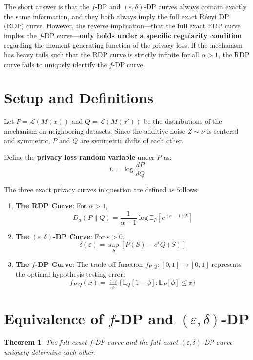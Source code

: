 \documentclass[11pt]{article}
\newtheorem{theorem}{Theorem}
\begin{document}
The short answer is that the $f$-DP and $(\varepsilon,\delta)$-DP curves always contain exactly the same information, and they both always imply the full exact R\'enyi DP (RDP) curve. However, the reverse implication---that the full exact RDP curve implies the $f$-DP curve---\textbf{only holds under a specific regularity condition} regarding the moment generating function of the privacy loss. If the mechanism has heavy tails such that the RDP curve is strictly infinite for all $\alpha > 1$, the RDP curve fails to uniquely identify the $f$-DP curve.

\section{Setup and Definitions}

Let $P = \mathcal{L}(M(x))$ and $Q = \mathcal{L}(M(x'))$ be the distributions of the mechanism on neighboring datasets. Since the additive noise $Z \sim \nu$ is centered and symmetric, $P$ and $Q$ are symmetric shifts of each other. 

Define the \textbf{privacy loss random variable} under $P$ as:
\[ L = \log \frac{dP}{dQ} \]

The three exact privacy curves in question are defined as follows:
\begin{enumerate}
    \item \textbf{The RDP Curve}: For $\alpha > 1$,
    \[ D_\alpha(P\|Q) = \frac{1}{\alpha-1} \log \mathbb{E}_P \left[ e^{(\alpha-1)L} \right] \]
    \item \textbf{The $(\varepsilon, \delta)$-DP Curve}: For $\varepsilon > 0$,
    \[ \delta(\varepsilon) = \sup_{S} [P(S) - e^\varepsilon Q(S)] \]
    \item \textbf{The $f$-DP Curve}: The trade-off function $f_{P,Q}: [0,1] \to [0,1]$ represents the optimal hypothesis testing error:
    \[ f_{P,Q}(x) = \inf_{\phi} \{ \mathbb{E}_Q[1 - \phi] : \mathbb{E}_P[\phi] \le x \} \]
\end{enumerate}

\section{Equivalence of $f$-DP and $(\varepsilon, \delta)$-DP}

\begin{theorem}
The full exact $f$-DP curve and the full exact $(\varepsilon, \delta)$-DP curve uniquely determine each other.
\end{theorem}
\end{document}
